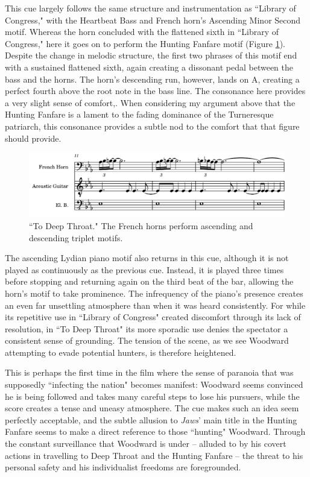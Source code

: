 This cue largely follows the same structure and instrumentation as ``Library of Congress," with the Heartbeat Bass and French horn's Ascending Minor Second motif.
Whereas the horn concluded with the flattened sixth in ``Library of Congress," here it goes on to perform the Hunting Fanfare motif (Figure \ref{fig:president-deep-fanfare}).
Despite the change in melodic structure, the first two phrases of this motif end with a sustained flattened sixth, again creating a dissonant pedal between the bass and the horns.
The horn's descending run, however, lands on A\flat, creating a perfect fourth above the root note in the bass line.
The consonance here provides a very slight sense of comfort,.
When considering my argument above that the Hunting Fanfare is a lament to the fading dominance of the Turneresque patriarch, this consonance provides a subtle nod to the comfort that that figure should provide.


\begin{figure}
    \centering
    \includegraphics[width=1\linewidth]{img/president-deep-fanfare.pdf}
    \caption{``To Deep Throat." The French horns perform ascending and descending triplet motifs.}
    \label{fig:president-deep-fanfare}
\end{figure}
The ascending Lydian piano motif also returns in this cue, although it is not played as continuously as the previous cue.
Instead, it is played three times before stopping and returning again on the third beat of the bar, allowing the horn's motif to take prominence.
The infrequency of the piano's presence creates an even far unsettling atmosphere than when it was heard consistently.
For while its repetitive use in ``Library of Congress" created discomfort through its lack of resolution, in ``To Deep Throat" its more sporadic use denies the spectator a consistent sense of grounding.
The tension of the scene, as we see Woodward attempting to evade potential hunters, is therefore heightened.

This is perhaps the first time in the film where the sense of paranoia that was supposedly ``infecting the nation" becomes manifest:\autocites[][416]{perlstein_invisible_2014}
Woodward seems convinced he is being followed and takes many careful steps to lose his pursuers, while the score creates a tense and uneasy atmosphere.
The cue makes such an idea seem perfectly acceptable, and the subtle allusion to \textit{Jaws}' main title in the Hunting Fanfare seems to make a direct reference to those ``hunting" Woodward.
Through the constant surveillance that Woodward is under – alluded to by his covert actions in travelling to Deep Throat and the Hunting Fanfare – the threat to his personal safety and his individualist freedoms are foregrounded.


